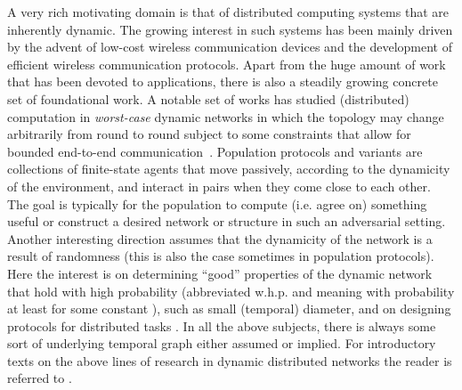 \documentclass[oribibl, 11pt]{llncs}
\begin{document}
A very rich motivating domain is that of distributed computing systems that are inherently dynamic. The growing interest in such systems has been mainly driven by the advent of low-cost wireless communication devices and the development of efficient wireless communication protocols. Apart from the huge amount of work that has been devoted to applications, there is also a steadily growing concrete set of foundational work. A notable set of works has studied (distributed) computation in \emph{worst-case} dynamic networks in which the topology may change arbitrarily from round to round subject to some constraints that allow for bounded end-to-end communication~\cite{OW05,KLO10,MCS14,MCS13b,DPRS13,APRU12}. Population protocols \cite{AADFP06} and variants \cite{MCS11-2,MS14b} are collections of finite-state agents that move passively, according to the dynamicity of the environment, and interact in pairs when they come close to each other. The goal is typically for the population to compute (i.e. agree on) something useful or construct a desired network or structure in such an adversarial setting. Another interesting direction assumes that the dynamicity of the network is a result of randomness (this is also the case sometimes in population protocols). Here the interest is on determining ``good'' properties of the dynamic network that hold with high probability (abbreviated w.h.p. and meaning with probability at least  for some constant ), such as small (temporal) diameter, and on designing protocols for distributed tasks \cite{CFTE08,AKL08}. In all the above subjects, there is always some sort of underlying temporal graph either assumed or implied. For introductory texts on the above lines of research in dynamic distributed networks the reader is referred to \cite{CFQS12,MCS11,Sc02,KO11}.
\end{document}
